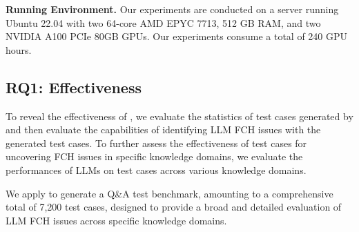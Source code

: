 \noindent \textbf{Running Environment.} 
Our experiments are conducted on a server running Ubuntu 22.04 with two 64-core AMD EPYC 7713, 512 GB RAM, and two NVIDIA A100 PCIe 80GB GPUs. Our experiments consume a total of 240 GPU hours. %



\subsection{RQ1: Effectiveness}
To reveal the effectiveness of \tool, we evaluate the statistics of test cases generated by \tool and then evaluate the capabilities of identifying LLM FCH issues with the generated test cases. 
To further assess the effectiveness of test cases for uncovering FCH issues in specific knowledge domains, we evaluate the performances of LLMs on test cases across various knowledge domains.

 We apply \tool to generate a Q\&A test benchmark, amounting to a comprehensive total of 7,200 test cases, designed to provide a broad and detailed evaluation of LLM FCH issues across specific knowledge domains. 


